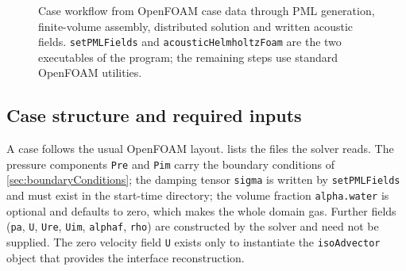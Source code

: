 \documentclass[final,12pt,nopreprintline]{elsarticle}
\newcommand{\code}[1]{\texttt{#1}}
\begin{document}
\begin{figure}[htbp]
    \centering
    \caption{Case workflow from OpenFOAM case data through PML generation,
    finite-volume assembly, distributed solution and written acoustic fields.
    \code{setPMLFields} and \code{acousticHelmholtzFoam} are the two
    executables of the program; the remaining steps use standard OpenFOAM
    utilities.}
    \label{fig:workflow}
\end{figure}

\subsection{Case structure and required inputs}
\label{sec:caseInputs}

A case follows the usual OpenFOAM layout.   lists the
files the solver reads.  The pressure components \code{Pre} and \code{Pim}
carry the boundary conditions of \cref{sec:boundaryConditions}; the damping
tensor \code{sigma} is written by \code{setPMLFields} and must exist in the
start-time directory; the volume fraction \code{alpha.water} is optional and
defaults to zero, which makes the whole domain gas.  Further fields
(\code{pa}, \code{U}, \code{Ure}, \code{Uim}, \code{alphaf}, \code{rho}) are
constructed by the solver and need not be supplied.  The zero velocity field
\code{U} exists only to instantiate the \code{isoAdvector} object that
provides the interface reconstruction.
\end{document}
